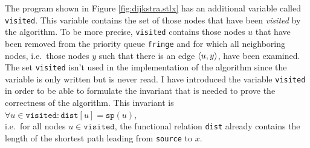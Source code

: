 The program shown in Figure \ref{fig:dijkstra.stlx} has an additional variable called \texttt{visited}.
This variable contains the set of those nodes that have been  \emph{visited} by the algorithm.
To be more precise, \texttt{visited} contains those nodes $u$ that have been removed from the
priority queue \texttt{fringe} and for which all neighboring nodes, i.e.~those nodes $y$ such that
there is an edge $\pair(u,y)$, have been examined.
The set \texttt{visited} isn't used in the implementation of the algorithm since the variable is
only written but is never read.
I have introduced the variable \texttt{visited} in order to be able to formulate the invariant that
is needed to prove the correctness of the algorithm.  This invariant is
\\[0.2cm]
\hspace*{1.3cm}
$\forall u\in\mathtt{visited}: \texttt{dist}[u] = \texttt{sp}(u)$,
\\[0.2cm]
i.e.~for all nodes $u \in \texttt{visited}$, the functional relation \texttt{dist}
already contains the length of the shortest path leading from \texttt{source} to $x$.  
\vspace*{0.1cm}


